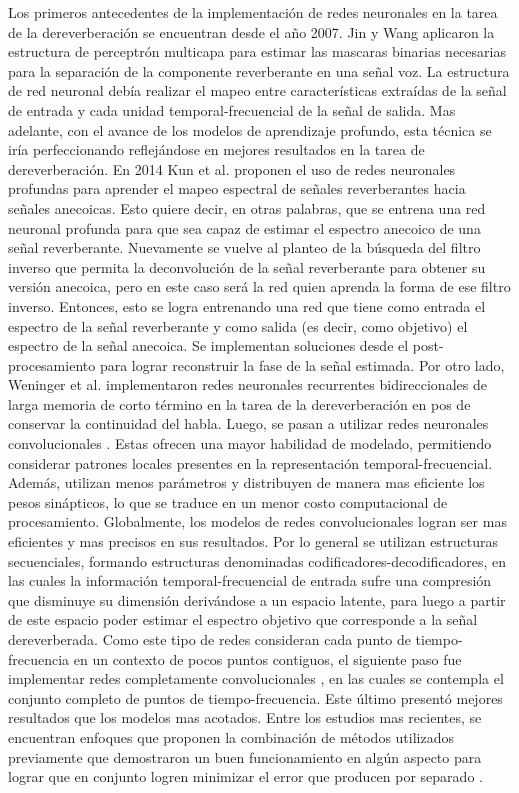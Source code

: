 Los primeros antecedentes de la implementación de redes neuronales en la tarea de la dereverberación se encuentran desde el año 2007. Jin y Wang \cite{MLP} aplicaron la estructura de perceptrón multicapa para estimar las mascaras binarias necesarias para la separación de la componente reverberante en una señal voz. La estructura de red neuronal debía realizar el mapeo entre características extraídas de la señal de entrada y cada unidad temporal-frecuencial de la señal de salida. Mas adelante, con el avance de los modelos de aprendizaje profundo, esta técnica se iría perfeccionando reflejándose en mejores resultados en la tarea de dereverberación. En 2014 Kun et al. \cite{ezeKun} proponen el uso de redes neuronales profundas para aprender el mapeo espectral de señales reverberantes hacia señales anecoicas. Esto quiere decir, en otras palabras, que se entrena una red neuronal profunda para que sea capaz de estimar el espectro anecoico de una señal reverberante. Nuevamente se vuelve al planteo de la búsqueda del filtro inverso que permita la deconvolución de la señal reverberante para obtener su versión anecoica, pero en este caso será la red quien aprenda la forma de ese filtro inverso. Entonces, esto se logra entrenando una red que tiene como entrada el espectro de la señal reverberante y como salida (es decir, como objetivo) el espectro de la señal anecoica. Se implementan soluciones desde el post-procesamiento para lograr reconstruir la fase de la señal estimada.
Por otro lado, Weninger et al. \cite{RNN} implementaron redes neuronales recurrentes bidireccionales de larga memoria de corto término en la tarea de la dereverberación en pos de conservar la continuidad del habla. 
Luego, se pasan a utilizar redes neuronales convolucionales \cite{CNN}. Estas ofrecen una mayor habilidad de modelado, permitiendo considerar patrones locales presentes en la representación temporal-frecuencial. Además, utilizan menos parámetros y distribuyen de manera mas eficiente los pesos sinápticos, lo que se traduce en un menor costo computacional de procesamiento. Globalmente, los modelos de redes convolucionales logran ser mas eficientes y mas precisos en sus resultados. Por lo general se utilizan estructuras secuenciales, formando estructuras denominadas codificadores-decodificadores, en las cuales la información temporal-frecuencial de entrada sufre una compresión que disminuye su dimensión derivándose a un espacio latente, para luego a partir de este espacio poder estimar el espectro objetivo que corresponde a la señal dereverberada. Como este tipo de redes consideran cada punto de tiempo-frecuencia en un contexto de pocos puntos contiguos, el siguiente paso fue implementar redes completamente convolucionales \cite{FCN}, en las cuales se contempla el conjunto completo de puntos de tiempo-frecuencia. Este último presentó mejores resultados que los modelos mas acotados. 
Entre los estudios mas recientes, se encuentran enfoques que proponen la combinación de métodos utilizados previamente que demostraron un buen funcionamiento en algún aspecto para lograr que en conjunto logren minimizar el error que producen por separado \cite{fusion}.  
